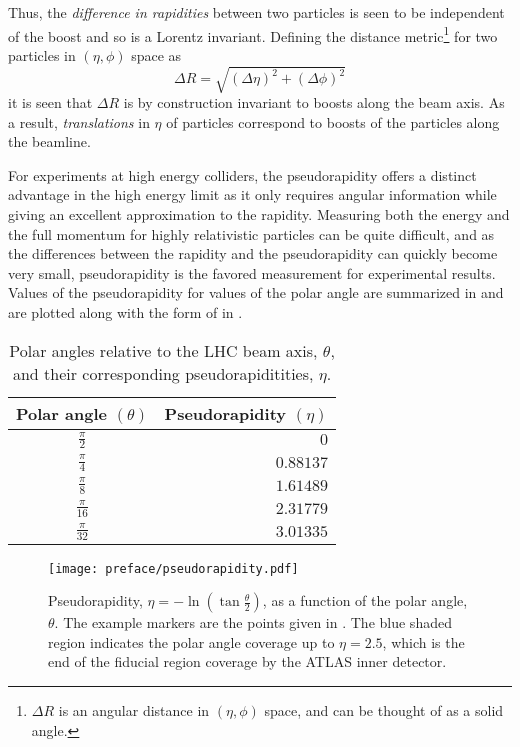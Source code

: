 Thus, the \emph{difference in rapidities} between two particles is seen to be independent of the boost and so is a \Gls{Lorentz invariant}.
Defining the distance metric\footnote{$\Delta R$ is an angular distance in $\left(\eta, \phi\right)$ space, and can be thought of as a solid angle.} for two particles in $\left(\eta, \phi\right)$ space as
\begin{equation}
 \Delta R = \sqrt{\left(\Delta\eta\right)^{2} + \left(\Delta\phi\right)^{2}}
 \label{eq:DeltaR}
\end{equation}
it is seen that $\Delta R$ is by construction invariant to boosts along the beam axis.
As a result, \emph{translations} in $\eta$ of particles correspond to \glspl{boost} of the particles along the beamline.

For experiments at high energy colliders, the pseudorapidity offers a distinct advantage in the high energy limit as it only requires angular information while giving an excellent approximation to the rapidity.
Measuring both the energy and the full momentum for highly relativistic particles can be quite difficult, and as the differences between the rapidity and the pseudorapidity can quickly become very small, pseudorapidity is the favored measurement for experimental results.
Values of the pseudorapidity for values of the polar angle are summarized in  and are plotted along with the form of  in .

\begin{table}[htpb]
 \centering
 \caption{Polar angles relative to the LHC beam axis, $\theta$, and their corresponding pseudorapiditities, $\eta$.}
 \begin{tabular}{@{}cr@{}} \toprule
  Polar angle $(\theta)$ & Pseudorapidity $(\eta)$ \\ \midrule
  $\frac{\pi}{2}$        & $0$                     \\
  $\frac{\pi}{4}$        & $0.88137$               \\
  $\frac{\pi}{8}$        & $1.61489$               \\
  $\frac{\pi}{16}$       & $2.31779$               \\
  $\frac{\pi}{32}$       & $3.01335$               \\
  \bottomrule
 \end{tabular}\label{table:pseudorapidity_angles}%
\end{table}

\begin{figure}[htbp]
 \centering
 \texttt{[image: preface/pseudorapidity.pdf]}
 \caption[Pseudorapidity as a function of the polar angle.]{%
  Pseudorapidity, $\eta = - \ln \left(\tan \frac{\theta}{2}\right)$, as a function of the polar angle, $\theta$.
  The example markers are the points given in .
  The blue shaded region indicates the polar angle coverage up to $\eta = 2.5$, which is the end of the fiducial region coverage by the ATLAS inner detector.}
 \label{fig:pseudorapidity_angles}
\end{figure}

